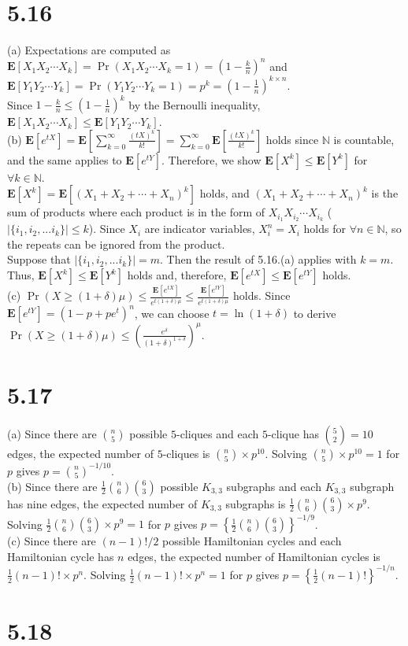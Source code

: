\documentclass{article}
\begin{document}
\section*{5.16}
(a) Expectations are computed as $\textbf{E}[X_1X_2\cdots X_k]=\Pr(X_1X_2\cdots X_k=1)=(1-\frac{k}{n})^n$ 
and $\textbf{E}[Y_1Y_2\cdots Y_k]=\Pr(Y_1Y_2\cdots Y_k=1)=p^k=(1-\frac{1}{n})^{k\times n}$.\\
Since $1-\frac{k}{n}\leq (1-\frac{1}{n})^k$ by the Bernoulli inequality, $\textbf{E}[X_1X_2\cdots X_k]\leq \textbf{E}[Y_1Y_2\cdots Y_k]$.\\
(b) $\textbf{E}[e^{tX}]=\textbf{E}\left[\sum\limits_{k=0}^\infty\frac{(tX)^k}{k!}\right]=\sum\limits_{k=0}^\infty\textbf{E}[\frac{(tX)^k}{k!}]$
holds since $\mathbb{N}$ is countable, and the same applies to $\textbf{E}[e^{tY}]$.
Therefore, we show $\textbf{E}[X^k]\leq\textbf{E}[Y^k]$ for $\forall k\in \mathbb{N}$.\\
$\textbf{E}[X^k]=\textbf{E}[(X_1+X_2+\cdots+X_n)^k]$ holds, and $(X_1+X_2+\cdots+X_n)^k$ is the sum of products where each product is in the form of $X_{i_1}X_{i_2}\cdots X_{i_k}$ ($|\{i_1,i_2,...i_k\}|\leq k$).
Since $X_i$ are indicator variables, $X_i^n=X_i$ holds for $\forall n \in \mathbb{N}$, so the repeats can be ignored from the product.\\
Suppose that $|\{i_1,i_2,...i_k\}|=m$. Then the result of 5.16.(a) applies with $k=m$. Thus, $\textbf{E}[X^k]\leq\textbf{E}[Y^k]$ holds and, therefore, $\textbf{E}[e^{tX}]\leq\textbf{E}[e^{tY}]$ holds.\\
(c) $\Pr(X\geq(1+\delta)\mu)\leq\frac{\textbf{E}[e^{tX}]}{e^{t(1+\delta)\mu}}\leq\frac{\textbf{E}[e^{tY}]}{e^{t(1+\delta)\mu}}$ holds. 
Since $\textbf{E}[e^{tY}]=(1-p+pe^t)^n$, we can choose $t=\ln(1+\delta)$ to derive $\Pr(X\geq(1+\delta)\mu)\leq\left(\frac{e^\delta}{(1+\delta)^{1+\delta}}\right)^\mu$.
\section*{5.17}
(a) Since there are $\binom{n}{5}$ possible $5$-cliques and each $5$-clique has $\binom{5}{2}=10$ edges, the expected number of $5$-cliques is $\binom{n}{5}\times p^{10}$.
Solving $\binom{n}{5}\times p^{10}=1$ for $p$ gives $p=\binom{n}{5}^{-1/10}$.\\
(b) Since there are $\frac{1}{2}\binom{n}{6}\binom{6}{3}$ possible $K_{3,3}$ subgraphs and each $K_{3,3}$ subgraph has nine edges,
the expected number of $K_{3,3}$ subgraphs is $\frac{1}{2}\binom{n}{6}\binom{6}{3}\times p^9$.
Solving $\frac{1}{2}\binom{n}{6}\binom{6}{3}\times p^9=1$ for $p$ gives $p=\left\{\frac{1}{2}\binom{n}{6}\binom{6}{3}\right\}^{-1/9}$.\\
(c) Since there are $(n-1)!/2$ possible Hamiltonian cycles and each Hamiltonian cycle has $n$ edges,
the expected number of Hamiltonian cycles is $\frac{1}{2}(n-1)!\times p^n$.
Solving $\frac{1}{2}(n-1)!\times p^n=1$ for $p$ gives $p=\left\{\frac{1}{2}(n-1)!\right\}^{-1/n}$.
\section*{5.18}
\end{document}

